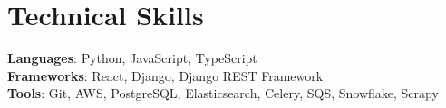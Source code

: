 \documentclass[letterpaper,11pt]{article}
\begin{document}
\section{Technical Skills}
 \begin{itemize}[leftmargin=0.15in, label={}]
    \small{\item{
     \textbf{Languages}{: Python, JavaScript, TypeScript} \\
     \textbf{Frameworks}{: React, Django, Django REST Framework} \\
     \textbf{Tools}{: Git, AWS, PostgreSQL, Elasticsearch, Celery, SQS, Snowflake, Scrapy}
    }}
 \end{itemize}
\end{document}
